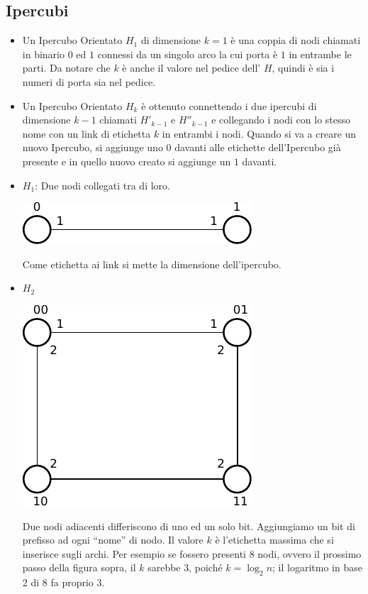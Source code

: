 \subsection{Ipercubi}
\begin{itemize}
    \item Un Ipercubo Orientato $H_1$ di dimensione $k=1$ è una coppia di nodi
          chiamati in binario $0$ ed $1$ connessi da un singolo arco la cui
          porta è $1$ in entrambe le parti. Da notare che $k$ è anche il valore nel
          pedice dell' $H$, quindi è sia i numeri di porta sia nel pedice.
    \item Un Ipercubo Orientato $H_k$ è ottenuto connettendo i due ipercubi di
          dimensione $k-1$ chiamati $H'_{k-1}$ e $H''_{k-1}$ e collegando i nodi
          con lo stesso nome con un link di etichetta $k$ in entrambi i nodi.
          Quando si va a creare un nuovo Ipercubo, si aggiunge uno $0$ davanti
          alle etichette dell'Ipercubo già presente e in quello nuovo creato si
          aggiunge un $1$ davanti.
\end{itemize}

\begin{itemize}
    \item $H_1$: Due nodi collegati tra di loro.
          \begin{center}
              \includegraphics[scale=0.8]{capitoli/broadcast/imgs/n_10}
          \end{center}
          Come etichetta ai link si mette la dimensione dell'ipercubo.

    \item $H_2$
          \begin{center}
              \includegraphics[scale=0.8]{capitoli/broadcast/imgs/n_11}
          \end{center}
          Due nodi adiacenti differiscono di uno ed un solo bit. Aggiungiamo un
          bit di prefisso ad ogni ``nome'' di nodo. Il valore $k$ è l'etichetta
          massima che si inserisce sugli archi. Per esempio se fossero presenti 8
          nodi, ovvero il prossimo passo della figura sopra, il $k$ sarebbe 3,
          poiché $k = \log_2{n}$; il logaritmo in base 2 di 8 fa proprio 3.
\end{itemize}

